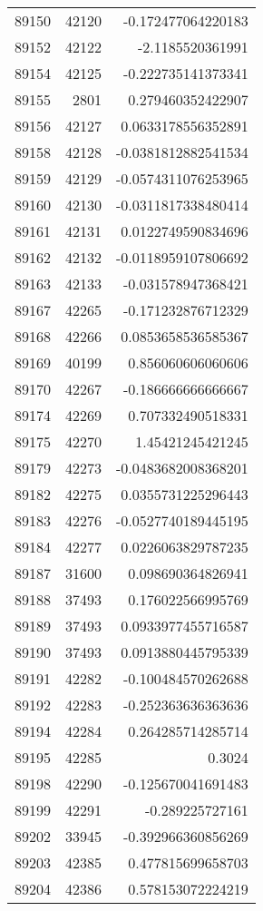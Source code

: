 \begin{tabular}{r | r | r}
89150 & 42120 & -0.172477064220183 \\
89152 & 42122 & -2.1185520361991 \\
89154 & 42125 & -0.222735141373341 \\
89155 & 2801 & 0.279460352422907 \\
89156 & 42127 & 0.0633178556352891 \\
89158 & 42128 & -0.0381812882541534 \\
89159 & 42129 & -0.0574311076253965 \\
89160 & 42130 & -0.0311817338480414 \\
89161 & 42131 & 0.0122749590834696 \\
89162 & 42132 & -0.0118959107806692 \\
89163 & 42133 & -0.031578947368421 \\
89167 & 42265 & -0.171232876712329 \\
89168 & 42266 & 0.0853658536585367 \\
89169 & 40199 & 0.856060606060606 \\
89170 & 42267 & -0.186666666666667 \\
89174 & 42269 & 0.707332490518331 \\
89175 & 42270 & 1.45421245421245 \\
89179 & 42273 & -0.0483682008368201 \\
89182 & 42275 & 0.0355731225296443 \\
89183 & 42276 & -0.0527740189445195 \\
89184 & 42277 & 0.0226063829787235 \\
89187 & 31600 & 0.098690364826941 \\
89188 & 37493 & 0.176022566995769 \\
89189 & 37493 & 0.0933977455716587 \\
89190 & 37493 & 0.0913880445795339 \\
89191 & 42282 & -0.100484570262688 \\
89192 & 42283 & -0.252363636363636 \\
89194 & 42284 & 0.264285714285714 \\
89195 & 42285 & 0.3024 \\
89198 & 42290 & -0.125670041691483 \\
89199 & 42291 & -0.289225727161 \\
89202 & 33945 & -0.392966360856269 \\
89203 & 42385 & 0.477815699658703 \\
89204 & 42386 & 0.578153072224219 \\

\end{tabular}
